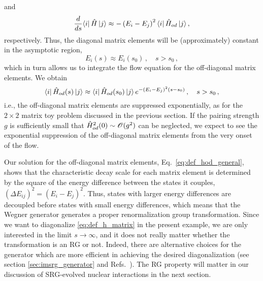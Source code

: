 and
\begin{align}
   \frac{d {}} {d {s}} \langle{i}|\,{\hat{H}}\,|{j}\rangle
  \approx-\left(E_i-E_j\right)^2\langle{i}|\,{\hat{H}_{od}}\,|{j}\rangle\,,
\end{align}
respectively. Thus, the diagonal matrix elements will be (approximately)
constant in the asymptotic region,
\begin{equation}
  E_i(s) \approx E_i(s_0)\,,\quad s>s_0\,,
\end{equation}
which in turn allows us to integrate the flow equation for the off-diagonal
matrix elements. We obtain
\begin{equation}\label{eq:def_hod_general}
  \matrixe{i}{\HO_{od}(s)}{j} \approx \matrixe{i}{\HO_{od}(s_0)}{j}\,e^{-(E_i-E_j)^2 (s-s_0)}\,, \quad s>s_0\,,
\end{equation}
i.e., the off-diagonal matrix elements are suppressed exponentially, as for the
$2\times2$ matrix toy problem discussed in the previous section. If the pairing
strength $g$ is sufficiently small that $\hat{H}^2_{od}(0)\sim \mathcal{O}(g^2)$ can 
be neglected, we expect to see the exponential suppression of the off-diagonal 
matrix elements from the very onset of the flow. 

Our solution for the off-diagonal matrix elements, Eq.~\eqref{eq:def_hod_general},
shows that the characteristic decay scale for each matrix element is determined 
by the square of the energy difference between the states it couples, 
$(\Delta E_{ij})^2 = (E_i-E_j)^2$. Thus, states with larger energy differences
are decoupled before states with small energy differences, which means that 
the Wegner generator generates a proper renormalization group transformation.
Since we want to diagonalize \eqref{eq:def_h_matrix} in the present example,
we are only interested in the limit $s\to\infty$, and it does not really matter
whether the transformation is an RG or not. Indeed, there are alternative choices
for the generator which are more efficient in achieving the desired diagonalization
(see section \ref{sec:imsrg_generator} and Refs.~\cite{Hergert:2016jk,Hergert:2016ng}).
The RG property will matter in our discussion of SRG-evolved nuclear interactions 
in the next section.

%
%
